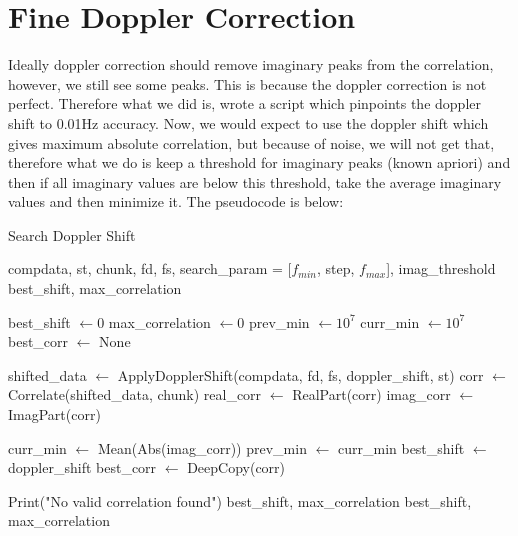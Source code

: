 \documentclass[12pt]{report}
\begin{document}
\section{Fine Doppler Correction}
Ideally doppler correction should remove imaginary peaks from the correlation, however, we still see some peaks. This is because the doppler correction is not perfect. Therefore what we did is, wrote a script which pinpoints the doppler shift to 0.01Hz accuracy. 
Now, we would expect to use the doppler shift which gives maximum absolute correlation, but because of noise, we will not get that, therefore what we do is keep a threshold for imaginary peaks (known apriori)
and then if all imaginary values are below this threshold, take the average imaginary values and then minimize it. The pseudocode is below:

\begin{algorithm}
\caption{Search Doppler Shift}
\begin{algorithmic}[1]
\REQUIRE compdata, st, chunk, fd, fs, search\_param = [$f_{min}$, step, $f_{max}$], imag\_threshold
\ENSURE best\_shift, max\_correlation

\STATE best\_shift $\leftarrow 0$
\STATE max\_correlation $\leftarrow 0$
\STATE prev\_min $\leftarrow 10^7$
\STATE curr\_min $\leftarrow 10^7$
\STATE best\_corr $\leftarrow$ None

    \STATE shifted\_data $\leftarrow$ ApplyDopplerShift(compdata, fd, fs, doppler\_shift, st)
    \STATE corr $\leftarrow$ Correlate(shifted\_data, chunk)
    \STATE real\_corr $\leftarrow$ RealPart(corr)
    \STATE imag\_corr $\leftarrow$ ImagPart(corr)
    
        \STATE curr\_min $\leftarrow$ Mean(Abs(imag\_corr))
            \STATE prev\_min $\leftarrow$ curr\_min
            \STATE best\_shift $\leftarrow$ doppler\_shift
            \STATE best\_corr $\leftarrow$ DeepCopy(corr)
        \ENDIF
    \ENDIF
\ENDFOR

    \STATE Print("No valid correlation found")
    \RETURN best\_shift, max\_correlation
\ENDIF
\RETURN best\_shift, max\_correlation

\end{algorithmic}
\end{algorithm}
\end{document}
